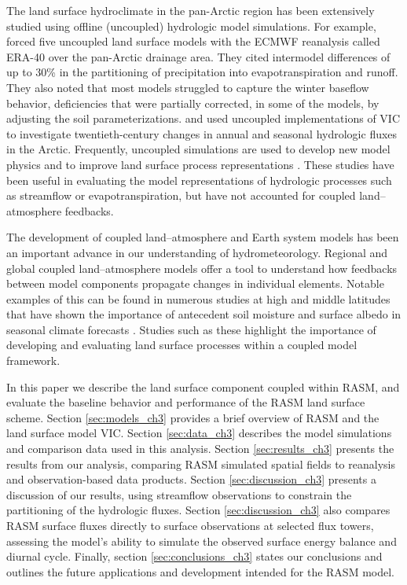 The land surface hydroclimate in the pan-Arctic region has been extensively studied using offline (uncoupled) hydrologic model simulations.
For example, \citet{Slater_2007} forced five uncoupled land surface models with the ECMWF reanalysis called ERA-40 over the pan-Arctic drainage area.
They cited intermodel differences of up to 30\% in the partitioning of precipitation into evapotranspiration and runoff.
They also noted that most models struggled to capture the winter baseflow behavior, deficiencies that were partially corrected, in some of the models, by adjusting the soil parameterizations.
\citet{Adam_2007} and \citet{Tan_2011} used uncoupled implementations of VIC to investigate twentieth-century changes in annual and seasonal hydrologic fluxes in the Arctic.
Frequently, uncoupled simulations are used to develop new model physics and to improve land surface process representations \citep{Bonan_2011,Bowling_2004,Bowling_2010,Cherkauer_2003,Swenson_2012}.
These studies have been useful in evaluating the model representations of hydrologic processes such as streamflow or evapotranspiration, but have not accounted for coupled land–atmosphere feedbacks.

The development of coupled land–atmosphere and Earth system models has been an important advance in our understanding of hydrometeorology.
Regional and global coupled land–atmosphere models offer a tool to understand how feedbacks between model components propagate changes in individual elements.
Notable examples of this can be found in numerous studies at high and middle latitudes that have shown the importance of antecedent soil moisture and surface albedo in seasonal climate forecasts \citep{Beljaars_1996,Betts_2004,Dominguez_2006,Koster_2004}.
Studies such as these highlight the importance of developing and evaluating land surface processes within a coupled model framework.

In this paper we describe the land surface component coupled within RASM, and evaluate the baseline behavior and performance of the RASM land surface scheme.
Section \ref{sec:models_ch3} provides a brief overview of RASM and the land surface model VIC.
Section \ref{sec:data_ch3} describes the model simulations and comparison data used in this analysis.
Section \ref{sec:results_ch3} presents the results from our analysis, comparing RASM simulated spatial fields to reanalysis and observation-based data products.
Section \ref{sec:discussion_ch3} presents a discussion of our results, using streamflow observations to constrain the partitioning of the hydrologic fluxes.
Section \ref{sec:discussion_ch3} also compares RASM surface fluxes directly to surface observations at selected flux towers, assessing the model’s ability to simulate the observed surface energy balance and diurnal cycle.
Finally, section \ref{sec:conclusions_ch3} states our conclusions and outlines the future applications and development intended for the RASM model.

